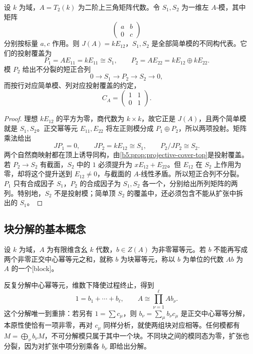\begin{example}\label{b5:exm:triangular-projective-covers}
	设 \(k\) 为域，\(A=T_2(k)\) 为二阶上三角矩阵代数。令 \(S_1,S_2\) 为一维左 \(A\)-模，其中矩阵
	\[
		\begin{pmatrix}a&b\\0&c\end{pmatrix}
	\]
	分别按标量 \(a,c\) 作用。则 \(J(A)=kE_{12}\)，\(S_1,S_2\) 是全部简单模的不同构代表。它们的投射覆盖为
	\[
		P_1=AE_{11}=kE_{11}\cong S_1,\qquad P_2=AE_{22}=kE_{12}\oplus kE_{22}.
	\]
	模 \(P_2\) 给出不分裂的短正合列
	\[
		0\longrightarrow S_1\longrightarrow P_2 \longrightarrow S_2\longrightarrow0,
	\]
	而按行对应简单模、列对应投射覆盖的约定，
	\[
		C_A=\begin{pmatrix}1&1\\0&1\end{pmatrix}.
	\]
\end{example}
\begin{proof}
	理想 \(kE_{12}\) 的平方为零，商代数为 \(k\times k\)，故它正是 \(J(A)\)，且两个简单模就是 \(S_1,S_2\)。正交幂等元 \(E_{11},E_{22}\) 将左正则模分成 \(P_1\oplus P_2\)，所以两项投射。矩阵乘法给出
	\[
		JP_1=0,\qquad JP_2=kE_{12}\cong S_1, \qquad P_2/JP_2\cong S_2.
	\]
	两个自然商映射都在顶上诱导同构，由\cref{b5:prop:projective-cover-top}是投射覆盖。 若 \(P_2\to S_2\) 有截面，\(S_2\) 中的 \(1\) 必须提升为 \(xE_{12}+E_{22}\)。但 \(E_{12}\) 在 \(S_2\) 上作用为零，却将这个提升送到 \(E_{12}\ne0\)，与截面的 \(A\)-线性矛盾。所以短正合列不分裂。\(P_1\) 只有合成因子 \(S_1\)，\(P_2\) 的合成因子为 \(S_1,S_2\) 各一个，分别给出所列矩阵的两列。特别地，\(S_2\) 不是投射模；简单顶 \(S_2\) 的覆盖中，还必须包含不能从扩张中拆出的 \(S_1\)。
\end{proof}

\subsection{块分解的基本概念}
\label{b5:subsec:0802:03}

\begin{definition}\label{b5:def:algebra-block}
	设 \(k\) 为域，\(A\) 为有限维含幺 \(k\) 代数，\(b\in Z(A)\) 为非零幂等元。若 \(b\) 不能再写成两个非零正交中心幂等元之和，就称 \(b\) 为块幂等元，称以 \(b\) 为单位的代数 \(Ab\) 为 \(A\) 的一个[block]。
\end{definition}
反复分解中心幂等元，维数下降使过程终止，得到
\[
	1=b_1+\cdots+b_\ell,\qquad A\cong\prod_{\nu=1}^{\ell}Ab_\nu.
\]
这个分解唯一到重排：若另有 \(1=\sum c_\mu\)，则 \(b_\nu=\sum_\mu b_\nu c_\mu\) 是正交中心幂等分解，本原性使恰有一项非零，再对 \(c_\mu\) 同样分析，就使两组块对应相等。任何模都有 \(M=\bigoplus_\nu b_\nu M\)，不可分解模只属于其中一个块。不同块之间的模同态为零，扩张也分裂，因为对扩张中项分别乘各 \(b_\nu\) 即给出分解。

